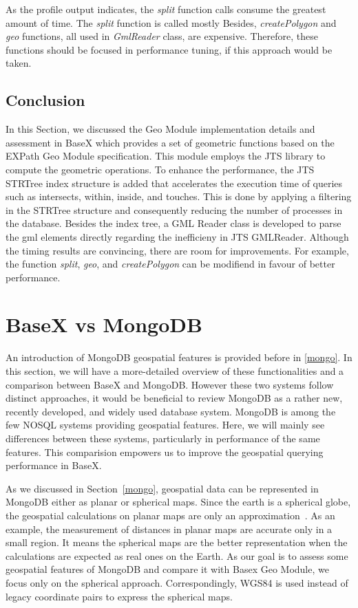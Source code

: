 \documentclass[a4paper,12pt]{article}
\begin{document}
As the profile output indicates, the \textit{split} function calls consume the greatest amount of time. The \textit{split} function is called mostly Besides, \textit{createPolygon} and \textit{geo} functions, all used in \textit{GmlReader} class, are expensive. Therefore, these functions should be focused in performance tuning, if this approach would be taken.

\subsection{Conclusion}
\label{BXconc}
In this Section, we discussed the Geo Module implementation details and assessment in BaseX which provides a set of geometric functions based on the EXPath Geo Module specification. This module employs the JTS library to compute the geometric operations. To enhance the performance, the JTS STRTree index structure is added that accelerates the execution time of queries such as intersects, within, inside, and touches. This is done by applying a filtering in the STRTree structure and consequently reducing the number of processes in the database. Besides the index tree, a GML Reader class is developed to parse the gml elements directly regarding the inefficieny in JTS GMLReader. Although the timing results are convincing, there are room for improvements. For example, the function \textit{split}, \textit{geo}, and \textit{createPolygon} can be modifiend in favour of better performance.

\newpage
\section{BaseX vs MongoDB}
\label{s.mongo}

An introduction of MongoDB geospatial features is provided before in \ref{mongo}. In this section, we will have a more-detailed overview of these functionalities and a comparison between BaseX and MongoDB. However these two systems follow distinct approaches, it would be beneficial to review MongoDB as a rather new, recently developed, and widely used database system. MongoDB is among the few NOSQL systems providing geospatial features. Here, we will mainly see differences between these systems, particularly in performance of the same features. This comparision empowers us to improve the geospatial querying performance in BaseX. 

As we discussed in Section~\ref{mongo}, geospatial data can be represented in MongoDB either as planar or spherical maps. Since the earth is a spherical globe, the geospatial calculations on planar maps are only an approximation~\cite{coordsys,coordsys-mongo}. As an example, the measurement of distances in planar maps are accurate only in a small region. It means the spherical maps are the better representation when the calculations are expected as real ones on the Earth. As our goal is to assess some geospatial features of MongoDB and compare it with Basex Geo Module, we focus only on the spherical approach. Correspondingly, WGS84 is used instead of legacy coordinate pairs to express the spherical maps. 
\end{document}

